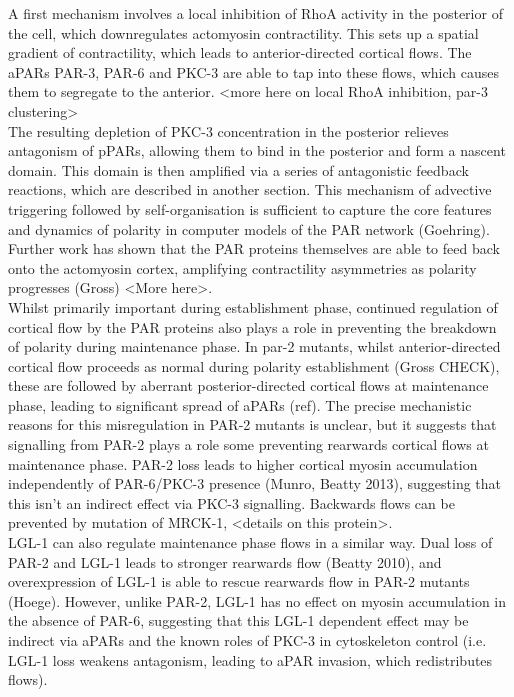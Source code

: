 \documentclass[12pt]{"article"}
\begin{document}
A first mechanism involves a local inhibition of RhoA activity in the posterior of the cell, which downregulates actomyosin contractility. This sets up a spatial gradient of contractility, which leads to anterior-directed cortical flows. The aPARs PAR-3, PAR-6 and PKC-3 are able to tap into these flows, which causes them to segregate to the anterior. <more here on local RhoA inhibition, par-3 clustering>\\

The resulting depletion of PKC-3 concentration in the posterior relieves antagonism of pPARs, allowing them to bind in the posterior and form a nascent domain. This domain is then amplified via a series of antagonistic feedback reactions, which are described in another section. This mechanism of advective triggering followed by self-organisation is sufficient to capture the core features and dynamics of polarity in computer models of the PAR network (Goehring).\\

Further work has shown that the PAR proteins themselves are able to feed back onto the actomyosin cortex, amplifying contractility asymmetries as polarity progresses (Gross) <More here>.\\

Whilst primarily important during establishment phase, continued regulation of cortical flow by the PAR proteins also plays a role in preventing the breakdown of polarity during maintenance phase. In par-2 mutants, whilst anterior-directed cortical flow proceeds as normal during polarity establishment (Gross CHECK), these are followed by aberrant posterior-directed cortical flows at maintenance phase, leading to significant spread of aPARs (ref). The precise mechanistic reasons for this misregulation in PAR-2 mutants is unclear, but it suggests that signalling from PAR-2 plays a role some preventing rearwards cortical flows at maintenance phase.  PAR-2 loss leads to higher cortical myosin accumulation independently of PAR-6/PKC-3 presence (Munro, Beatty 2013), suggesting that this isn’t an indirect effect via PKC-3 signalling. Backwards flows can be prevented by mutation of MRCK-1, <details on this protein>.\\

LGL-1 can also regulate maintenance phase flows in a similar way. Dual loss of PAR-2 and LGL-1 leads to stronger rearwards flow (Beatty 2010), and overexpression of LGL-1 is able to rescue rearwards flow in PAR-2 mutants (Hoege). However, unlike PAR-2, LGL-1 has no effect on myosin accumulation in the absence of PAR-6, suggesting that this LGL-1 dependent effect may be indirect via aPARs and the known roles of PKC-3 in cytoskeleton control (i.e. LGL-1 loss weakens antagonism, leading to aPAR invasion, which redistributes flows).\\
\end{document}
